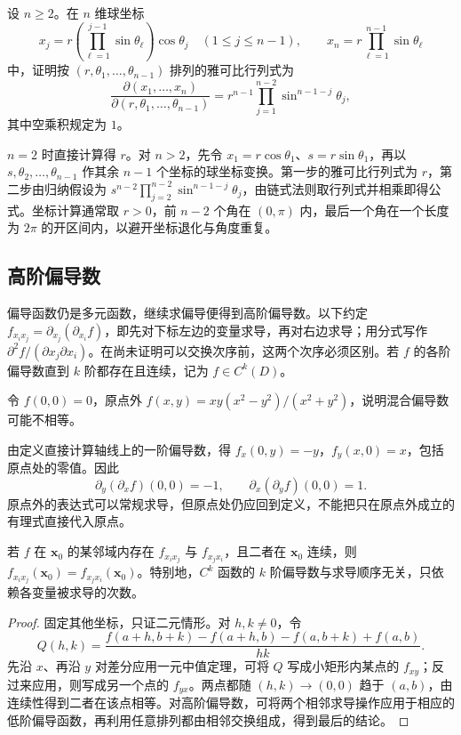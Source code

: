 \begin{example}
\label{ex:hyperspherical-jacobian-ch14}
设 $n\geq2$。在 $n$ 维球坐标
\[
    x_j=r\left(\prod_{\ell=1}^{j-1}\sin\theta_\ell\right)\cos\theta_j
       \quad(1\leq j\leq n-1),\qquad
    x_n=r\prod_{\ell=1}^{n-1}\sin\theta_\ell
\]
中，证明按 $(r,\theta_1,\ldots,\theta_{n-1})$ 排列的雅可比行列式为
\[
    \frac{\partial(x_1,\ldots,x_n)}{\partial(r,\theta_1,\ldots,\theta_{n-1})}
    =r^{n-1}\prod_{j=1}^{n-2}\sin^{n-1-j}\theta_j,
\]
其中空乘积规定为 $1$。
\end{example}
\begin{solve}
$n=2$ 时直接计算得 $r$。对 $n>2$，先令 $x_1=r\cos\theta_1$、$s=r\sin\theta_1$，再以 $s,\theta_2,\ldots,\theta_{n-1}$ 作其余 $n-1$ 个坐标的球坐标变换。第一步的雅可比行列式为 $r$，第二步由归纳假设为 $s^{n-2}\prod_{j=2}^{n-2}\sin^{n-1-j}\theta_j$，由链式法则取行列式并相乘即得公式。坐标计算通常取 $r>0$，前 $n-2$ 个角在 $(0,\pi)$ 内，最后一个角在一个长度为 $2\pi$ 的开区间内，以避开坐标退化与角度重复。
\end{solve}

\subsection{高阶偏导数}
\label{subsec:higher-partial-derivatives}

偏导函数仍是多元函数，继续求偏导便得到高阶偏导数。以下约定 $f_{x_ix_j}=\partial_{x_j}(\partial_{x_i}f)$，即先对下标左边的变量求导，再对右边求导；用分式写作 $\partial^2f/(\partial x_j\partial x_i)$。在尚未证明可以交换次序前，这两个次序必须区别。若 $f$ 的各阶偏导数直到 $k$ 阶都存在且连续，记为 $f\in C^k(D)$。

\begin{example}
\label{ex:unequal-mixed-partials-ch14}
令 $f(0,0)=0$，原点外 $f(x,y)=xy(x^2-y^2)/(x^2+y^2)$，说明混合偏导数可能不相等。
\end{example}
\begin{solve}
由定义直接计算轴线上的一阶偏导数，得 $f_x(0,y)=-y$，$f_y(x,0)=x$，包括原点处的零值。因此
\[
    \partial_y(\partial_xf)(0,0)=-1,\qquad
    \partial_x(\partial_yf)(0,0)=1.
\]
原点外的表达式可以常规求导，但原点处仍应回到定义，不能把只在原点外成立的有理式直接代入原点。
\end{solve}

\begin{theorem}[混合偏导数交换定理]
\label{thm:schwarz-mixed-partials-ch14}
若 $f$ 在 $\boldsymbol x_0$ 的某邻域内存在 $f_{x_ix_j}$ 与 $f_{x_jx_i}$，且二者在 $\boldsymbol x_0$ 连续，则
$f_{x_ix_j}(\boldsymbol x_0)=f_{x_jx_i}(\boldsymbol x_0)$。特别地，$C^k$ 函数的 $k$ 阶偏导数与求导顺序无关，只依赖各变量被求导的次数。
\end{theorem}
\begin{proof}
固定其他坐标，只证二元情形。对 $h,k\ne0$，令
\[
    Q(h,k)=\frac{f(a+h,b+k)-f(a+h,b)-f(a,b+k)+f(a,b)}{hk}.
\]
先沿 $x$、再沿 $y$ 对差分应用一元中值定理，可将 $Q$ 写成小矩形内某点的 $f_{xy}$；反过来应用，则写成另一个点的 $f_{yx}$。两点都随 $(h,k)\to(0,0)$ 趋于 $(a,b)$，由连续性得到二者在该点相等。对高阶偏导数，可将两个相邻求导操作应用于相应的低阶偏导函数，再利用任意排列都由相邻交换组成，得到最后的结论。
\end{proof}

